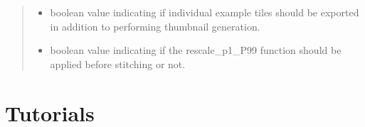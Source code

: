 \documentclass[a4paper,10pt,english,openany,oneside]{sphinxmanual}
\begin{document}
\begin{fulllineitems}
\begin{quote}
\begin{description}
\begin{itemize}
\item {} 
\sphinxAtStartPar
{} \textendash{} boolean value indicating if individual example tiles should be exported in addition to performing thumbnail generation.

\item {} 
\sphinxAtStartPar
{} \textendash{} boolean value indicating if the rescale\_p1\_P99 function should be applied before stitching or not.

\end{itemize}

\end{description}\end{quote}

\end{fulllineitems}



\chapter{Tutorials}
\label{\detokenize{pages/tutorials:tutorials}}\label{\detokenize{pages/tutorials::doc}}
\end{document}
